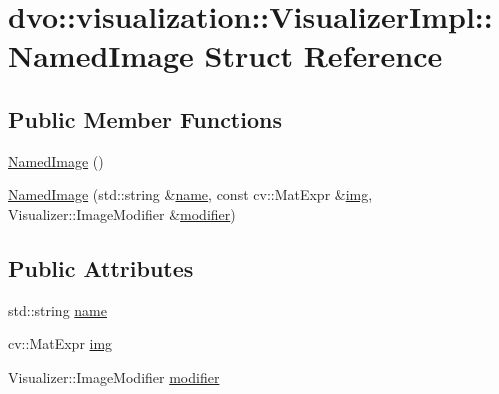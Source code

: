 \hypertarget{structdvo_1_1visualization_1_1_visualizer_impl_1_1_named_image}{}\section{dvo\+:\+:visualization\+:\+:Visualizer\+Impl\+:\+:Named\+Image Struct Reference}
\label{structdvo_1_1visualization_1_1_visualizer_impl_1_1_named_image}
\subsection*{Public Member Functions}
\begin{DoxyCompactItemize}
\item 
\mbox{\hyperlink{structdvo_1_1visualization_1_1_visualizer_impl_1_1_named_image_ad8d49d26aa2b0fd5166857b2ee913489}{Named\+Image}} ()
\item 
\mbox{\hyperlink{structdvo_1_1visualization_1_1_visualizer_impl_1_1_named_image_a85ef82568b83987428230f90bc4c00a2}{Named\+Image}} (std\+::string \&\mbox{\hyperlink{structdvo_1_1visualization_1_1_visualizer_impl_1_1_named_image_aa46e7e1b17cd744452ba8ef3dffddfe7}{name}}, const cv\+::\+Mat\+Expr \&\mbox{\hyperlink{structdvo_1_1visualization_1_1_visualizer_impl_1_1_named_image_a7ff904dac2fc68f459ee05a32abf3cea}{img}}, Visualizer\+::\+Image\+Modifier \&\mbox{\hyperlink{structdvo_1_1visualization_1_1_visualizer_impl_1_1_named_image_a831a0937bdfc9427f20669770f37f1d0}{modifier}})
\end{DoxyCompactItemize}
\subsection*{Public Attributes}
\begin{DoxyCompactItemize}
\item 
std\+::string \mbox{\hyperlink{structdvo_1_1visualization_1_1_visualizer_impl_1_1_named_image_aa46e7e1b17cd744452ba8ef3dffddfe7}{name}}
\item 
cv\+::\+Mat\+Expr \mbox{\hyperlink{structdvo_1_1visualization_1_1_visualizer_impl_1_1_named_image_a7ff904dac2fc68f459ee05a32abf3cea}{img}}
\item 
Visualizer\+::\+Image\+Modifier \mbox{\hyperlink{structdvo_1_1visualization_1_1_visualizer_impl_1_1_named_image_a831a0937bdfc9427f20669770f37f1d0}{modifier}}
\end{DoxyCompactItemize}


